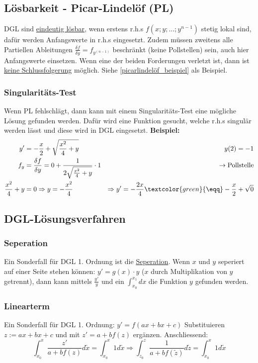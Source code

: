 \subsection{Lösbarkeit - Picar-Lindelöf (PL)}\label{picarlindelöf}
DGL sind \underline{eindeutig lösbar}, wenn erstens r.h.s $f(x;y;...;y^{n-1})$ stetig lokal sind, dafür werden Anfangswerte in r.h.s eingesetzt. Zudem müssen zweitens alle Partiellen Ableitungen $\frac{\delta f}{\delta y} = f_{y^{(n-1)}}$ beschränkt (keine Pollstellen) sein, auch hier Anfangswerte einsetzen. Wenn eine der beiden Forderungen verletzt ist, dann ist \underline{keine Schlussfolgerung} möglich. Siehe \ref{picarlindelöf_beispiel} als Beispiel.

\subsubsection{Singularitäts-Test}
Wenn PL fehlschlägt, dann kann mit einem Singularitäts-Test eine mögliche Lösung gefunden werden. Dafür wird eine Funktion gesucht, welche r.h.s singulär werden lässt und diese wird in DGL eingesetzt.
\noindent\textbf{Beispiel:}
\begin{align*}
	y' &= -\frac{x}{2} + \sqrt{\frac{x^2}{4} + y} &\qquad y(2) = -1 \\
	f_y &= \frac{\delta f}{\delta y} = 0 + \frac{1}{2\sqrt{\frac{x^2}{4} + y}} \cdot 1  &\to \text{Pollstelle} \\
	\frac{x^2}{4} + y &= 0 \Rightarrow y = -\frac{x^2}{4} &\Rightarrow y' = -\frac{2x}{4} \textcolor{green}{\eqq} -\frac{x}{2} + \sqrt{0}
\end{align*}


\subsection{DGL-Lösungsverfahren}
\subsubsection{Seperation}
Ein Sonderfall für DGL 1. Ordnung ist die \underline{Seperation}. Wenn $x$ und $y$ seperiert auf einer Seite stehen können: $y' = g(x)\cdot y $ ($x$ durch Multiplikation von $y$ getrennt), dann kann mittels $\frac{y'}{y}$ und ein $\int_{x_0}^{x_1}dx$ die Funktion $y$ gefunden werden.

\subsubsection{Linearterm}
Ein Sonderfall für DGL 1. Ordnung: $y' = f(ax +bx+c)$ Substituieren $z := ax + bx +c$ und mit $z' = a + bf(z)$ ergänzen. Anschliessend: \[
\int_{x_0}^{x}\frac{z'}{a+bf(z)}d\tilde{x} = \int_{x_0}^{x}1d\tilde{x} \Rightarrow \int_{z_0}^{z}\frac{1}{a +bf(\tilde{z})}d\tilde{z} = \int_{x_0}^{x}1d\tilde{x}
\] 


